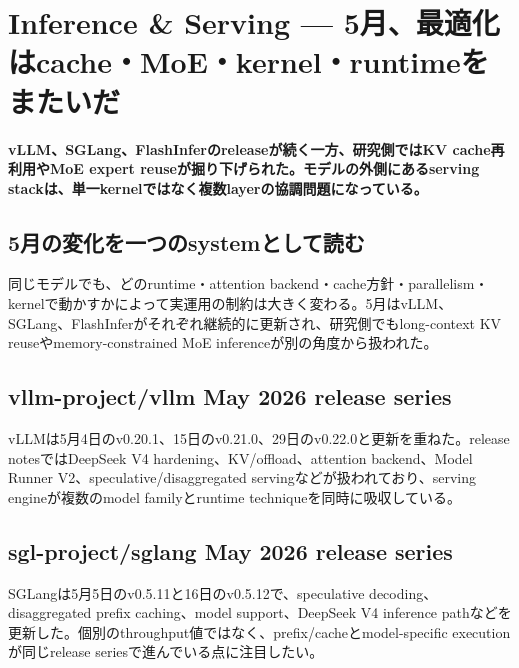 \section{Inference \& Serving — 5月、最適化はcache・MoE・kernel・runtimeをまたいだ}
\label{pkg:inference-serving-may}
\noindent\textbf{vLLM、SGLang、FlashInferのreleaseが続く一方、研究側ではKV cache再利用やMoE expert reuseが掘り下げられた。モデルの外側にあるserving stackは、単一kernelではなく複数layerの協調問題になっている。}\autocite{src-3707e05fd2a3,src-5a693cfc6852,src-69c5523286bd,src-74a7052acd7a,src-77e29e3fac8f,src-80b8d67933c0,src-ba75040df3fc,src-c97320147e8c}

\subsection{5月の変化を一つのsystemとして読む}

同じモデルでも、どのruntime・attention backend・cache方針・parallelism・kernelで動かすかによって実運用の制約は大きく変わる。5月はvLLM、SGLang、FlashInferがそれぞれ継続的に更新され、研究側でもlong-context KV reuseやmemory-constrained MoE inferenceが別の角度から扱われた。\autocite{src-3707e05fd2a3,src-5a693cfc6852,src-69c5523286bd,src-74a7052acd7a,src-77e29e3fac8f,src-80b8d67933c0,src-ba75040df3fc,src-c97320147e8c}


\subsection{vllm-project/vllm May 2026 release series}

vLLMは5月4日のv0.20.1、15日のv0.21.0、29日のv0.22.0と更新を重ねた。release notesではDeepSeek V4 hardening、KV/offload、attention backend、Model Runner V2、speculative/disaggregated servingなどが扱われており、serving engineが複数のmodel familyとruntime techniqueを同時に吸収している。\autocite{src-77e29e3fac8f,src-80b8d67933c0,src-c97320147e8c}


\subsection{sgl-project/sglang May 2026 release series}

SGLangは5月5日のv0.5.11と16日のv0.5.12で、speculative decoding、disaggregated prefix caching、model support、DeepSeek V4 inference pathなどを更新した。個別のthroughput値ではなく、prefix/cacheとmodel-specific executionが同じrelease seriesで進んでいる点に注目したい。\autocite{src-5a693cfc6852,src-69c5523286bd}


